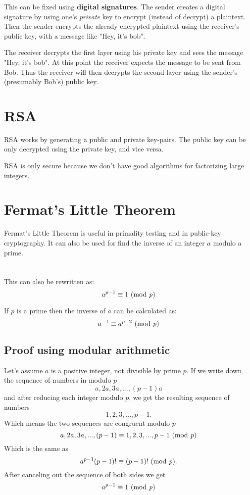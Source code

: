 \documentclass{article}
\begin{document}
	This can be fixed using \textbf{digital signatures}. The sender creates a digital signature by using one's \textit{private} key to encrypt (instead of decrypt) a plaintext. Then the sender encrypts the already encrypted plaintext using the receiver's public key, with a message like "Hey, it's bob". 
	
	The receiver decrypts the first layer using his private key and sees the message "Hey, it's bob". At this point the receiver expects the message to be sent from Bob. Thus the receiver will then decrypts the second layer using the sender's (presumably Bob's) public key. 
	
	\section*{RSA \cite{rsa-crypt}} 
	RSA works by generating a public and private key-pairs. The public key can be only decrypted using the private key, and vice versa.

	RSA is only secure because we don't have good algorithms for factorizing large integers. \cite{rsa-sec}	
	
	\section*{Fermat's Little Theorem} 
	Fermat's Little Theorem is useful in primality testing and in public-key cryptography. It can also be used for find the inverse of  an integer $a$ modulo a prime. \cite{fermatsummary}
	\\
	\\
	\\

	This can also be rewritten as: 
	$$
	a^{p-1} \equiv 1 \text{ (mod \textit{p})}
	$$
	
	If $p$ is a prime then the inverse of $a$ can be calculated as:
	$$
	a^{-1} \equiv a^{p-2} \text{ (mod \textit{p})}
	$$
	
 	\subsection*{Proof using modular arithmetic \cite{fermatproof}}
 	Let's assume $a$ is a positive integer, not divisible by prime $p$. If we write down the sequence of numbers in modulo $p$
 	$$
 	a,2a,3a,...,(p-1)a
 	$$
 	and after reducing each integer modulo $p$, we get the resulting sequence of numbers
 	$$
 	1,2,3,...,p-1.
 	$$
 	Which means the two sequences are congruent modulo $p$ 
 	$$
 	a,2a,3a,...,(p-1) \equiv 1,2,3,...,p-1 \text{ (mod \textit{p})}
 	$$
 	Which is the same as 
 	$$
 	a^{p-1}(p-1)! \equiv (p-1)! \text{ (mod \textit{p})}.
 	$$
 	After canceling out the sequence of both sides we get
 	$$
	a^{p-1} \equiv 1 \text{ (mod \textit{p})}
 	$$
 	
\end{document}
